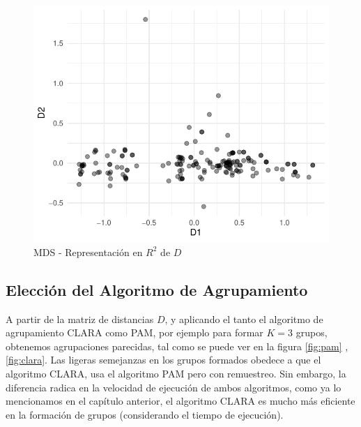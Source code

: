 \documentclass[12pt,oneside]{book}\usepackage[]{graphicx}\usepackage[]{color}
\makeatletter
\def\maxwidth{ %
  \ifdim\Gin@nat@width>\linewidth
    \linewidth
  \else
    \Gin@nat@width
  \fi
}
\newenvironment{knitrout}{}{} %
\theoremstyle{definition} %
\makeatother
\begin{document}
\begin{knitrout}
\color{fgcolor}\begin{figure}[h]

{\centering \includegraphics[width=\maxwidth]{figure/unnamed-chunk-3-1} 

}

\caption[MDS - Representación en $R^2$ de $D$]{MDS - Representación en $R^2$ de $D$}\label{fig:unnamed-chunk-3}
\end{figure}


\end{knitrout}

\label{fig:puntosD}



\subsection{Elección del Algoritmo de Agrupamiento}

A partir de la matriz de distancias $D$, y aplicando el tanto el algoritmo de agrupamiento CLARA como PAM, por ejemplo para formar $K=3$ grupos, obtenemos agrupaciones parecidas, tal como se puede ver en la figura \ref{fig:pam} , \ref{fig:clara}. Las ligeras semejanzas en los grupos formados obedece a que el algoritmo CLARA, usa el algoritmo PAM pero con remuestreo. Sin embargo, la diferencia radica en la velocidad de ejecución de ambos algoritmos, como ya lo mencionamos en el capítulo anterior, el algoritmo CLARA es mucho más eficiente en la formación de grupos (considerando el tiempo de ejecución).
\end{document}
